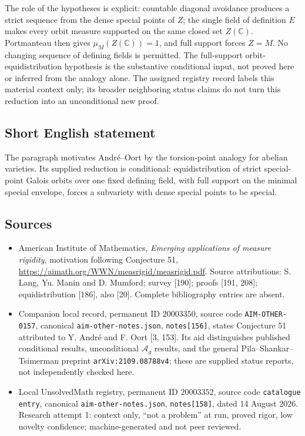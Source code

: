 \documentclass[11pt]{article}
\newcommand{\C}{\mathbb{C}}
\begin{document}
The role of the hypotheses is explicit: countable diagonal avoidance produces a strict sequence from the dense special points of $Z$; the single field of definition $E$ makes every orbit measure supported on the same closed set $Z(\C)$. Portmanteau then gives $\mu_M(Z(\C))=1$, and full support forces $Z=M$. No changing sequence of defining fields is permitted. The full-support orbit-equidistribution hypothesis is the substantive conditional input, not proved here or inferred from the analogy alone. The assigned registry record labels this material context only; its broader neighboring status claims do not turn this reduction into an unconditional new proof.
\subsection{Short English statement}
The paragraph motivates Andr\'e--Oort by the torsion-point analogy for abelian varieties. Its supplied reduction is conditional: equidistribution of strict special-point Galois orbits over one fixed defining field, with full support on the minimal special envelope, forces a subvariety with dense special points to be special.
\subsection{Sources}
\begin{itemize}
\item American Institute of Mathematics, \emph{Emerging applications of measure rigidity}, motivation following Conjecture 51, \url{https://aimath.org/WWN/measrigid/measrigid.pdf}. Source attributions: S. Lang, Yu. Manin and D. Mumford; survey [190]; proofs [191, 208]; equidistribution [186], also [20]. Complete bibliography entries are absent.
\item Companion local record, permanent ID $20003350$, source code \texttt{AIM-OTHER-0157}, canonical \texttt{aim-other-notes.json}, \texttt{notes[156]}, states Conjecture 51 attributed to Y. Andr\'e and F. Oort [3, 153]. Its aid distinguishes published conditional results, unconditional $\mathcal A_g$ results, and the general Pila--Shankar--Tsimerman preprint \texttt{arXiv:2109.08788v4}; these are supplied status reports, not independently checked here.
\item Local UnsolvedMath registry, permanent ID $20003352$, source code \texttt{catalogue entry}, canonical \texttt{aim-other-notes.json}, \texttt{notes[158]}, dated 14 August 2026. Research attempt 1: context only, ``not a problem'' at run, proved rigor, low novelty confidence; machine-generated and not peer reviewed.
\end{itemize}
\end{document}
